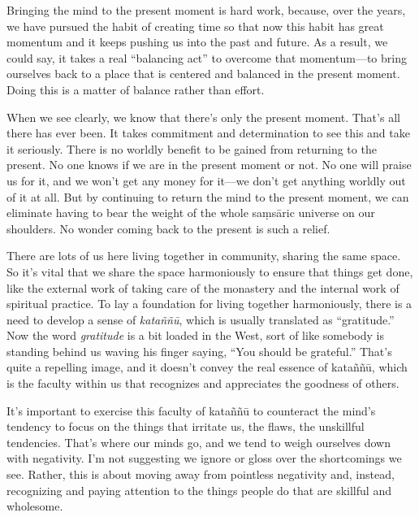 Bringing the mind to the present moment is hard work, because, over the 
years, we have pursued the habit of creating time so that now this 
habit has great momentum and it keeps pushing us into the past and 
future. As a result, we could say, it takes a real ``balancing act'' to 
overcome that momentum---to bring ourselves back to a place that is 
centered and balanced in the present moment. Doing this is a matter of 
balance rather than effort.

When we see clearly, we know that there's only the present moment. 
That's all there has ever been. It takes commitment and determination 
to see this and take it seriously. There is no worldly benefit to be 
gained from returning to the present. No one knows if we are in the 
present moment or not. No one will praise us for it, and we won't get 
any money for it---we don't get anything worldly out of it at all. But 
by continuing to return the mind to the present moment, we can 
eliminate having to bear the weight of the whole saṃsāric universe 
on our shoulders. No wonder coming back to the present is such a relief.


There are lots of us here living together in community, sharing the 
same space. So it's vital that we share the space harmoniously to 
ensure that things get done, like the external work of taking care of 
the monastery and the internal work of spiritual practice. To lay a 
foundation for living together harmoniously, there is a need to develop 
a sense of \emph{kataññū}, which is usually translated as 
``gratitude.'' Now the word \emph{gratitude} is a bit loaded in the 
West, sort of like somebody is standing behind us waving his finger 
saying, ``You should be grateful.'' That's quite a repelling image, and 
it doesn't convey the real essence of kataññū, which is the faculty 
within us that recognizes and appreciates the goodness of others.

It's important to exercise this faculty of kataññū to counteract the 
mind's tendency to focus on the things that irritate us, the flaws, the 
unskillful tendencies. That's where our minds go, and we tend to weigh 
ourselves down with negativity. I'm not suggesting we ignore or gloss 
over the shortcomings we see. Rather, this is about moving away from 
pointless negativity and, instead, recognizing and paying attention to 
the things people do that are skillful and wholesome.

